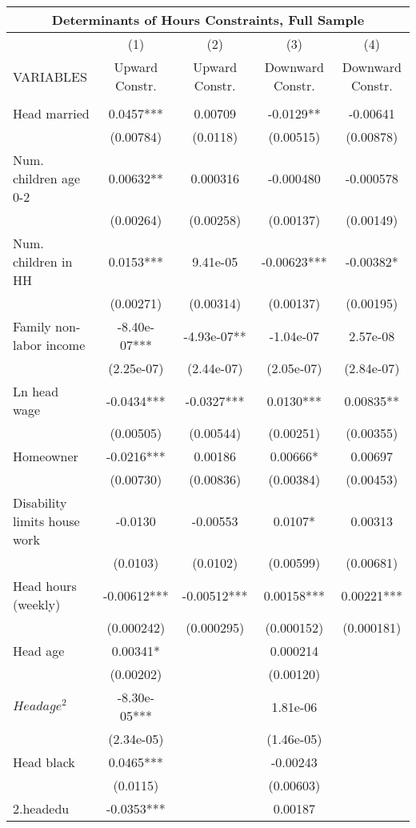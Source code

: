 \begin{tabular}{lcccc}
\multicolumn{5}{c}{Determinants of Hours Constraints, Full Sample} \\ \hline
 & (1) & (2) & (3) & (4) \\
VARIABLES & Upward Constr. & Upward Constr. & Downward Constr. & Downward Constr. \\ \hline
 &  &  &  &  \\
Head married & 0.0457*** & 0.00709 & -0.0129** & -0.00641 \\
 & (0.00784) & (0.0118) & (0.00515) & (0.00878) \\
Num. children age 0-2 & 0.00632** & 0.000316 & -0.000480 & -0.000578 \\
 & (0.00264) & (0.00258) & (0.00137) & (0.00149) \\
Num. children in HH & 0.0153*** & 9.41e-05 & -0.00623*** & -0.00382* \\
 & (0.00271) & (0.00314) & (0.00137) & (0.00195) \\
Family non-labor income & -8.40e-07*** & -4.93e-07** & -1.04e-07 & 2.57e-08 \\
 & (2.25e-07) & (2.44e-07) & (2.05e-07) & (2.84e-07) \\
Ln head wage & -0.0434*** & -0.0327*** & 0.0130*** & 0.00835** \\
 & (0.00505) & (0.00544) & (0.00251) & (0.00355) \\
Homeowner & -0.0216*** & 0.00186 & 0.00666* & 0.00697 \\
 & (0.00730) & (0.00836) & (0.00384) & (0.00453) \\
Disability limits house work & -0.0130 & -0.00553 & 0.0107* & 0.00313 \\
 & (0.0103) & (0.0102) & (0.00599) & (0.00681) \\
Head hours (weekly) & -0.00612*** & -0.00512*** & 0.00158*** & 0.00221*** \\
 & (0.000242) & (0.000295) & (0.000152) & (0.000181) \\
Head age & 0.00341* &  & 0.000214 &  \\
 & (0.00202) &  & (0.00120) &  \\
$ Head age^2$ & -8.30e-05*** &  & 1.81e-06 &  \\
 & (2.34e-05) &  & (1.46e-05) &  \\
Head black & 0.0465*** &  & -0.00243 &  \\
 & (0.0115) &  & (0.00603) &  \\
2.headedu & -0.0353*** &  & 0.00187 &  \\

\end{tabular}
